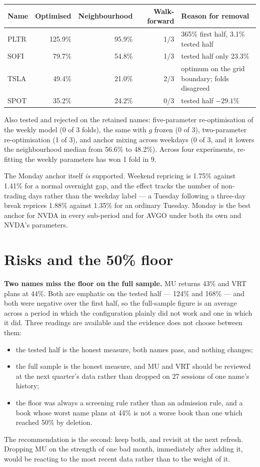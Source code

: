 \documentclass[11pt]{article}
\begin{document}
\begin{table}[H]\centering\small
\begin{tabular}{lrrrl}
\toprule
\textbf{Name} & \textbf{Optimised} & \textbf{Neighbourhood} & \textbf{Walk-forward} &
\textbf{Reason for removal}\\
\midrule
\rowcolor{bcwarn} PLTR & 125.9\% & 95.9\% & 1/3 & 365\% first half, 3.1\% tested half\\
SOFI & 79.7\%  & 54.8\% & 1/3 & tested half only 23.3\%\\
\rowcolor{bcwarn} TSLA & 49.4\%  & 21.0\% & 2/3 & optimum on the grid boundary; folds disagreed\\
SPOT & 35.2\%  & 24.2\% & 0/3 & tested half $-29.1$\%\\
\bottomrule
\end{tabular}
\end{table}

Also tested and rejected on the retained names: five-parameter re-optimisation of the weekly model
(0 of 3 folds), the same with $g$ frozen (0 of 3), two-parameter re-optimisation (1 of 3), and
anchor mixing across weekdays (0 of 3, and it lowers the neighbourhood median from 56.6\% to
48.2\%). Across four experiments, re-fitting the weekly parameters has won 1 fold in 9.

The Monday anchor itself \emph{is} supported. Weekend repricing is 1.75\% against 1.41\% for a
normal overnight gap, and the effect tracks the number of non-trading days rather than the
weekday label --- a Tuesday following a three-day break reprices 1.88\% against 1.35\% for an
ordinary Tuesday. Monday is the best anchor for NVDA in every sub-period and for AVGO under both
its own and NVDA's parameters.

\section{Risks and the 50\% floor}

\textbf{Two names miss the floor on the full sample.} MU returns 43\% and VRT plans at 44\%. Both
are emphatic on the tested half --- 124\% and 168\% --- and both were negative over the first
half, so the full-sample figure is an average across a period in which the configuration plainly
did not work and one in which it did. Three readings are available and the evidence does not
choose between them:
\begin{itemize}[leftmargin=1.4em,topsep=0.2em]
\item the tested half is the honest measure, both names pass, and nothing changes;
\item the full sample is the honest measure, and MU and VRT should be reviewed at the next
      quarter's data rather than dropped on 27 sessions of one name's history;
\item the floor was always a screening rule rather than an admission rule, and a book whose worst
      name plans at 44\% is not a worse book than one which reached 50\% by deletion.
\end{itemize}
The recommendation is the second: keep both, and revisit at the next refresh. Dropping MU on the
strength of one bad month, immediately after adding it, would be reacting to the most recent data
rather than to the weight of it.
\end{document}
